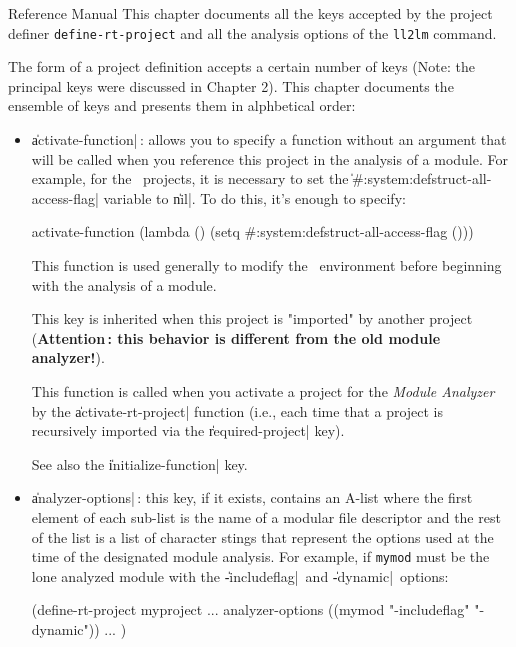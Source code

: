  {Reference Manual}
This chapter documents all the keys accepted by the project definer {\tt define-rt-project} and all the analysis options of the {\tt ll2lm} command.

The form of a project definition accepts a certain number of keys (Note:  the principal keys were discussed in Chapter 2).  This chapter documents the ensemble of keys and presents them in alphbetical order:

\begin{itemize}

\item {\Large \|activate-function|}\,: allows you to specify a function without an argument that will be called when you reference this project in the analysis of a module.  For example, for the \Aida\  projects, it is necessary to set the \|#:system:defstruct-all-access-flag| variable to \|nil|.  To do this, it's enough to specify: 

\begin{Longcode*}
activate-function (lambda () (setq #:system:defstruct-all-access-flag ()))
\end{Longcode*}

This function is used generally to modify the \Lisp\  environment before beginning with the analysis of a module.

This key is inherited when this project is "imported" by another project ({\bf Attention\,: this behavior is different from the old module analyzer!}).

This function is called when you activate a project for the {\em Module Analyzer} by the \|activate-rt-project| function (i.e., each time that a project is recursively imported via the \|required-project| key).

See also the \|initialize-function| key.

\item {\Large \|analyzer-options|}\,: this key, if it exists, contains an A-list where the first element of each sub-list is the name of a modular file descriptor and the rest of the list is a list of character stings that represent the options used at the time of the designated module analysis.
For example, if {\tt mymod} must be the lone analyzed module with the \|-includeflag|\ and \|-dynamic|\ options:
\begin{Code*}
(define-rt-project myproject
  ...
  analyzer-options ((mymod "-includeflag" "-dynamic"))
  ...
)
\end{Code*}


\end{itemize}
